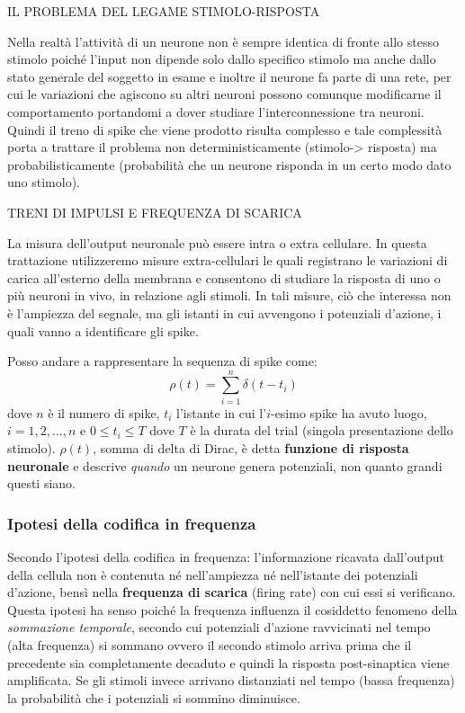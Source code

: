 \documentclass[12pt,a4paper,openany]{book}
\begin{document}
IL PROBLEMA DEL LEGAME STIMOLO-RISPOSTA

Nella realtà l'attività di un neurone non è sempre identica di fronte allo stesso stimolo poiché l'input non dipende solo dallo specifico stimolo ma anche dallo stato generale del soggetto in esame e inoltre il neurone fa parte di una rete, per cui le variazioni che agiscono su altri neuroni possono comunque modificarne il comportamento portandomi a dover studiare l'interconnessione tra neuroni. Quindi il treno di spike che viene prodotto risulta complesso e tale complessità porta a trattare il problema non deterministicamente (stimolo-> risposta) ma probabilisticamente (probabilità che un neurone risponda in un certo modo dato uno stimolo).

TRENI DI IMPULSI E FREQUENZA DI SCARICA

La misura dell'output neuronale può essere intra o extra cellulare. In questa trattazione utilizzeremo misure extra-cellulari le quali registrano le variazioni di carica all'esterno della membrana e consentono di studiare la risposta di uno o più neuroni in vivo, in relazione agli stimoli. In tali misure, ciò che interessa non è l'ampiezza del segnale, ma gli istanti in cui avvengono i potenziali d'azione, i quali vanno a identificare gli spike.

Posso andare a rappresentare la sequenza di spike come:
\[
\rho(t) = \sum_{i=1}^{n} \delta(t - t_i)
\]
dove $n$ è il numero di spike, $t_i$ l'istante in cui l'$i$-esimo spike ha avuto luogo, $i=1,2,\ldots,n$ e $0 \leq t_i \leq T$ dove $T$ è la durata del trial (singola presentazione dello stimolo). $\rho(t)$, somma di delta di Dirac, è detta \textbf{funzione di risposta neuronale} e descrive \emph{quando} un neurone genera potenziali, non quanto grandi questi siano.

\subsubsection{Ipotesi della codifica in frequenza}

Secondo l'ipotesi della codifica in frequenza: l'informazione ricavata dall'output della cellula non è contenuta né nell'ampiezza né nell'istante dei potenziali d'azione, bensì nella \textbf{frequenza di scarica }(firing rate) con cui essi si verificano. Questa ipotesi ha senso poiché la frequenza influenza il cosiddetto fenomeno della \textit{sommazione temporale}, secondo cui potenziali d'azione ravvicinati nel tempo (alta frequenza) si sommano ovvero il secondo stimolo arriva prima che il precedente sia completamente decaduto e quindi la risposta post-sinaptica viene amplificata. Se gli stimoli invece arrivano distanziati nel tempo (bassa frequenza) la probabilità che i potenziali si sommino diminuisce.
\end{document}
